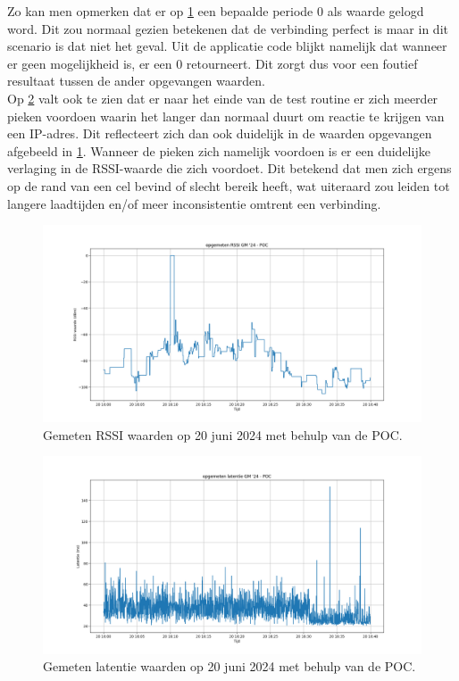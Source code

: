 Zo kan men opmerken dat er op \ref{fig:RSSI_POC} een bepaalde periode 0 als waarde gelogd word. Dit zou normaal gezien betekenen dat de verbinding perfect is maar in dit scenario is dat niet het geval. Uit de applicatie code blijkt namelijk dat wanneer er geen mogelijkheid is, er een 0 retourneert. Dit zorgt dus voor een foutief resultaat tussen de ander opgevangen waarden. \\

Op \ref{fig:Lat_POC} valt ook te zien dat er naar het einde van de test routine er zich meerder pieken voordoen waarin het langer dan normaal duurt om reactie te krijgen van een IP-adres. Dit reflecteert zich dan ook duidelijk in de waarden opgevangen afgebeeld in \ref{fig:RSSI_POC}. Wanneer de pieken zich namelijk voordoen is er een duidelijke verlaging in de RSSI-waarde die zich voordoet. Dit betekend dat men zich ergens op de rand van een cel bevind of slecht bereik heeft, wat uiteraard zou leiden tot langere laadtijden en/of meer inconsistentie omtrent een verbinding.

\begin{figure}
    \includegraphics[width=1.2\linewidth]{graphics/RSSI_graph_40min_POC}
    \caption[Gemeten RSSI waarden op 20 juni 2024 met behulp van de POC.]{Gemeten RSSI waarden op 20 juni 2024 met behulp van de POC.}
    \label{fig:RSSI_POC}
\end{figure}

\begin{figure}
    \includegraphics[width=1.2\linewidth]{graphics/latency_graph_40min_POC}
    \caption[Gemeten latentie waarden op 20 juni 2024 met behulp van de POC.]{Gemeten latentie waarden op 20 juni 2024 met behulp van de POC.}
    \label{fig:Lat_POC}
\end{figure}

